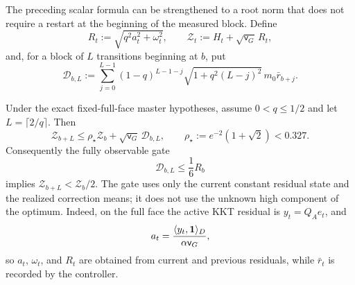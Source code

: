 The preceding scalar formula can be strengthened to a root norm that does not
require a restart at the beginning of the measured block.  Define
\begin{equation*}
 R_t:=\sqrt{q^2a_t^2+\omega_t^2},\qquad
 \mathcal Z_t:=H_t+\sqrt{\mathsf v_G}\,R_t,
\end{equation*}
and, for a block of $L$ transitions beginning at $b$, put
\begin{equation}
 \mathcal D_{b,L}
 :=\sum_{j=0}^{L-1}(1-q)^{L-1-j}
 \sqrt{1+q^2(L-j)^2}\,m_0\bar r_{b+j}.
 \label{eq:aesp-cd-observable-mean-deficit}
\end{equation}

\begin{corollary}
\label{cor:aesp-cd-observable-two-scale-window}
Under the exact fixed-full-face master hypotheses, assume $0<q\leq1/2$ and let
$L=\lceil2/q\rceil$.  Then
\begin{equation}
 \mathcal Z_{b+L}
 \leq \rho_\star\mathcal Z_b
       +\sqrt{\mathsf v_G}\,\mathcal D_{b,L},
 \qquad
 \rho_\star:=e^{-2}(1+\sqrt2)<0.327.
 \label{eq:aesp-cd-observable-two-scale-window}
\end{equation}
Consequently the fully observable gate
\begin{equation}
 \mathcal D_{b,L}\leq\frac16R_b
 \label{eq:aesp-cd-observable-two-scale-gate}
\end{equation}
implies $\mathcal Z_{b+L}<\mathcal Z_b/2$.  The gate uses only the current
constant residual state and the realized correction means; it does not use
the unknown high component of the optimum.  Indeed, on the full face the
active KKT residual is $y_t=Q_Ae_t$, and
\begin{equation*}
 a_t=\frac{\langle y_t,\mathbf{1}\rangle_D}
 {\alpha\mathsf v_G},
\end{equation*}
so $a_t$, $\omega_t$, and $R_t$ are obtained from current and previous
residuals, while $\bar r_t$ is recorded by the controller.
\end{corollary}

